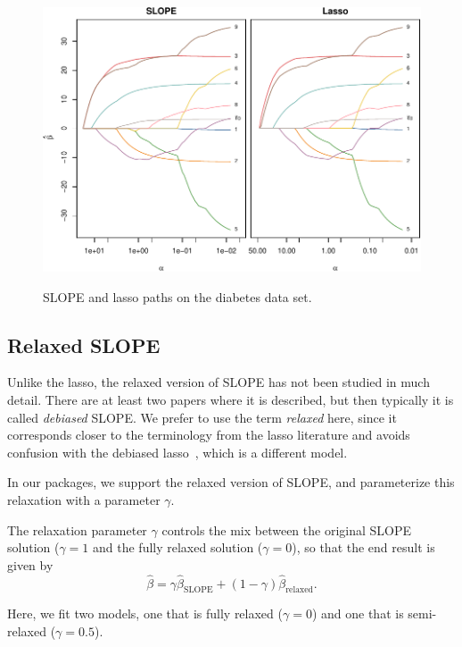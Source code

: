 \documentclass[article]{jss}
\makeatletter
\let\natwidth\Gin@nat@width
\makeatother
\begin{document}
\begin{figure}[t]
  \centering
  {\includegraphics[width=\natwidth]{images/diabetes-slope-lasso.pdf}}
  \caption{%
    SLOPE and lasso paths on the diabetes
    data set.
  }
  \label{fig:diabetes}
\end{figure}


\subsection{Relaxed SLOPE}

Unlike the lasso, the relaxed version of SLOPE has not been studied in much detail.
There are at least two papers where it is described, but then typically it is
called \emph{debiased} SLOPE. We prefer to use the term \emph{relaxed} here,
since it corresponds closer to the terminology from the lasso literature and
avoids confusion with the debiased lasso~\citep{geer2014}, which is a different
model.

In our packages, we support the relaxed version of SLOPE, and parameterize
this relaxation with a parameter \(\gamma\).

The relaxation parameter \(\gamma\) controls the mix between the
original SLOPE solution (\(\gamma = 1\) and the fully relaxed
solution (\(\gamma = 0\)), so that
the end result is given by
\[
  \hat{\beta} = \gamma \hat{\beta}_\text{SLOPE} + (1 - \gamma) \hat{\beta}_\text{relaxed}.
\]

Here, we fit two models, one that is fully relaxed
(\(\gamma = 0\)) and one that is semi-relaxed (\(\gamma = 0.5\)).
\end{document}
